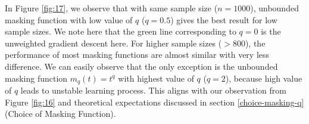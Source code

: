 In Figure \ref{fig:17}, we observe that with same sample size ($n = 1000$), unbounded masking function with low value of $q$ ($q=0.5$) gives the best result for low sample sizes. We note here that the green line corresponding to $q=0$ is the unweighted gradient descent here. For higher sample sizes ($>800$), the performance of most masking functions are almost similar with very less difference. We can easily observe that the only exception is the unbounded masking function $m_q(t) = t^q$ with highest value of $q$ ($q=2$), because high value of $q$ leads to unstable learning process. This aligns with our observation from Figure \ref{fig:16} and theoretical expectations discussed in section \ref{choice-masking-q} (Choice of Masking Function). 